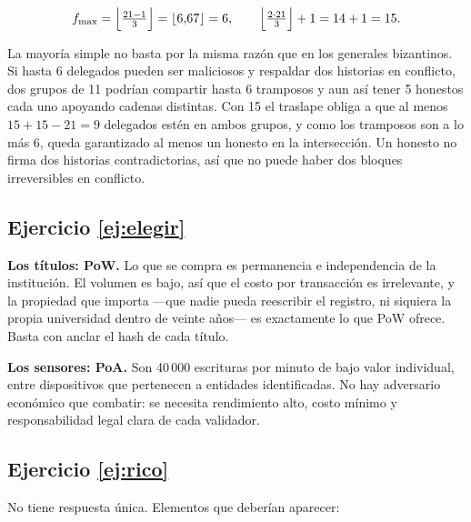 \documentclass[11pt,a4paper]{article}
\theoremstyle{definition}
\theoremstyle{plain}
\theoremstyle{remark}
\begin{document}
\[
  f_{\max} = \Bigl\lfloor \tfrac{21-1}{3} \Bigr\rfloor = \lfloor 6{,}67 \rfloor = 6,
  \qquad
  \Bigl\lfloor \tfrac{2\cdot 21}{3} \Bigr\rfloor + 1 = 14 + 1 = 15.
\]

La mayoría simple no basta por la misma razón que en los generales bizantinos.
Si hasta 6 delegados pueden ser maliciosos y respaldar dos historias en
conflicto, dos grupos de 11 podrían compartir hasta 6 tramposos y aun así tener 5
honestos cada uno apoyando cadenas distintas. Con 15 el traslape obliga a que al
menos $15 + 15 - 21 = 9$ delegados estén en ambos grupos, y como los tramposos
son a lo más 6, queda garantizado al menos un honesto en la intersección. Un
honesto no firma dos historias contradictorias, así que no puede haber dos
bloques irreversibles en conflicto.

\subsection*{Ejercicio \ref{ej:elegir}}

\textbf{Los títulos: PoW.} Lo que se compra es permanencia e independencia de la
institución. El volumen es bajo, así que el costo por transacción es
irrelevante, y la propiedad que importa —que nadie pueda reescribir el registro,
ni siquiera la propia universidad dentro de veinte años— es exactamente lo que
PoW ofrece. Basta con anclar el hash de cada título.

\textbf{Los sensores: PoA.} Son 40\,000 escrituras por minuto de bajo valor
individual, entre dispositivos que pertenecen a entidades identificadas. No hay
adversario económico que combatir: se necesita rendimiento alto, costo mínimo y
responsabilidad legal clara de cada validador.

\subsection*{Ejercicio \ref{ej:rico}}

No tiene respuesta única. Elementos que deberían aparecer:
\end{document}
